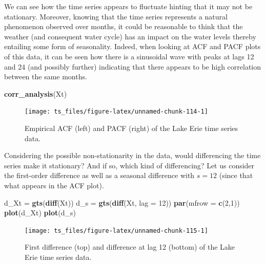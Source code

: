 \documentclass[]{book}
\newenvironment{Shaded}{\begin{snugshade}}{\end{snugshade}}
\newcommand{\KeywordTok}[1]{\textcolor[rgb]{0.13,0.29,0.53}{\textbf{#1}}}
\newcommand{\DataTypeTok}[1]{\textcolor[rgb]{0.13,0.29,0.53}{#1}}
\newcommand{\DecValTok}[1]{\textcolor[rgb]{0.00,0.00,0.81}{#1}}
\newcommand{\StringTok}[1]{\textcolor[rgb]{0.31,0.60,0.02}{#1}}
\newcommand{\NormalTok}[1]{#1}
\theoremstyle{definition}
\theoremstyle{definition}
\theoremstyle{definition}
\theoremstyle{remark}
\begin{document}
We can see how the time series appears to fluctuate hinting that it may
not be stationary. Moreover, knowing that the time series represents a
natural phenomenon observed over months, it could be reasonable to think
that the weather (and consequent water cycle) has an impact on the water
levels thereby entailing some form of seasonality. Indeed, when looking
at ACF and PACF plots of this data, it can be seen how there is a
sinusoidal wave with peaks at lags 12 and 24 (and possibly further)
indicating that there appears to be high correlation between the same
months.

\begin{Shaded}
\begin{Highlighting}[]
\KeywordTok{corr_analysis}\NormalTok{(Xt)}
\end{Highlighting}
\end{Shaded}

\begin{figure}

{\centering \texttt{[image: ts\_files/figure-latex/unnamed-chunk-114-1]} 

}

\caption{Empirical ACF (left) and PACF (right) of the Lake Erie time series data.}\label{fig:unnamed-chunk-114}
\end{figure}

Considering the possible non-stationarity in the data, would
differencing the time series make it stationary? And if so, which kind
of differencing? Let us consider the first-order difference as well as a
seasonal difference with \(s = 12\) (since that what appears in the ACF
plot).

\begin{Shaded}
\begin{Highlighting}[]
\NormalTok{d_Xt =}\StringTok{ }\KeywordTok{gts}\NormalTok{(}\KeywordTok{diff}\NormalTok{(Xt))}
\NormalTok{d_s =}\StringTok{ }\KeywordTok{gts}\NormalTok{(}\KeywordTok{diff}\NormalTok{(Xt, }\DataTypeTok{lag =} \DecValTok{12}\NormalTok{))}
\KeywordTok{par}\NormalTok{(}\DataTypeTok{mfrow =} \KeywordTok{c}\NormalTok{(}\DecValTok{2}\NormalTok{,}\DecValTok{1}\NormalTok{))}
\KeywordTok{plot}\NormalTok{(d_Xt)}
\KeywordTok{plot}\NormalTok{(d_s)}
\end{Highlighting}
\end{Shaded}

\begin{figure}

{\centering \texttt{[image: ts\_files/figure-latex/unnamed-chunk-115-1]} 

}

\caption{First difference (top) and difference at lag 12 (bottom) of the Lake Erie time series data.}\label{fig:unnamed-chunk-115}
\end{figure}
\end{document}
